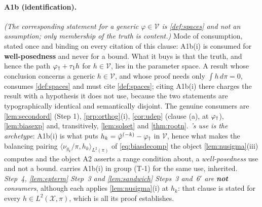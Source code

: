 \paragraph{A1b (identification).}

\emph{(The corresponding statement for a generic $\varphi\in\mathcal V$ is \cref{def:spaces} and not an
assumption; only membership of the truth is content.)}
Mode of consumption, stated once and binding on every citation of this clause: A1b(i) is consumed
for \textbf{well-posedness} and never for a bound. What it buys is that the truth, and hence the path
$\varphi_{\dagger}+\tau_1h$ for $h\in\mathcal V$, lies in the parameter space. A result whose conclusion
concerns a generic $h\in\mathcal V$, and whose proof needs only $\int h\,d\pi=0$, consumes
\cref{def:spaces} and must cite \cref{def:spaces}; citing A1b(i) there charges the result with a
hypothesis it does not use, because the two statements are typographically identical and semantically
disjoint. The genuine consumers are \cref{lem:secondord} \textup{(Step 1)}, \cref{prp:orthog}\textup{(i)},
\cref{cor:udep} \textup{(clause (a), at $\varphi_{\dagger}$)}, \cref{lem:biasexp} and, transitively,
\cref{lem:solset} and \cref{thm:rootn}.
\emph{'s use is the archetype}: A1b(i) is what puts
$h_k=\hat\varphi^{(-k)}-\varphi_{\dagger}$ in $\mathcal V$, hence what makes the balancing pairing
$\langle\nu_{g_k}/\pi,h_k\rangle_{L^{2}(\pi)}$ of \eqref{eq:biasdecomp} the object
\cref{lem:nusigma}\textup{(iii)} computes and the object A2 asserts a range condition about, a
\emph{well-posedness} use and not a bound.  carries
A1b(i) in group \textup{(T-1)} for the same use, inherited.
\emph{ Step~4, \cref{lem:epterm} Step~3 and \cref{lem:sandwich} Steps~3 and~6$'$
are \textbf{not} consumers}, although each applies \cref{lem:nusigma}\textup{(i)} at $h_k$:
that clause is stated for every $h\in L^{2}(\mathcal X,\pi)$, which is all its proof establishes.

